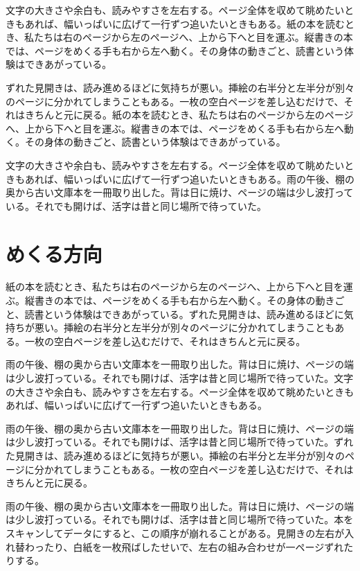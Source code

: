 \documentclass[a5paper,11pt]{ltjtbook}
\begin{document}
文字の大きさや余白も、読みやすさを左右する。ページ全体を収めて眺めたいときもあれば、幅いっぱいに広げて一行ずつ追いたいときもある。紙の本を読むとき、私たちは右のページから左のページへ、上から下へと目を運ぶ。縦書きの本では、ページをめくる手も右から左へ動く。その身体の動きごと、読書という体験はできあがっている。

ずれた見開きは、読み進めるほどに気持ちが悪い。挿絵の右半分と左半分が別々のページに分かれてしまうこともある。一枚の空白ページを差し込むだけで、それはきちんと元に戻る。紙の本を読むとき、私たちは右のページから左のページへ、上から下へと目を運ぶ。縦書きの本では、ページをめくる手も右から左へ動く。その身体の動きごと、読書という体験はできあがっている。

文字の大きさや余白も、読みやすさを左右する。ページ全体を収めて眺めたいときもあれば、幅いっぱいに広げて一行ずつ追いたいときもある。雨の午後、棚の奥から古い文庫本を一冊取り出した。背は日に焼け、ページの端は少し波打っている。それでも開けば、活字は昔と同じ場所で待っていた。

\chapter{めくる方向}
紙の本を読むとき、私たちは右のページから左のページへ、上から下へと目を運ぶ。縦書きの本では、ページをめくる手も右から左へ動く。その身体の動きごと、読書という体験はできあがっている。ずれた見開きは、読み進めるほどに気持ちが悪い。挿絵の右半分と左半分が別々のページに分かれてしまうこともある。一枚の空白ページを差し込むだけで、それはきちんと元に戻る。

雨の午後、棚の奥から古い文庫本を一冊取り出した。背は日に焼け、ページの端は少し波打っている。それでも開けば、活字は昔と同じ場所で待っていた。文字の大きさや余白も、読みやすさを左右する。ページ全体を収めて眺めたいときもあれば、幅いっぱいに広げて一行ずつ追いたいときもある。

雨の午後、棚の奥から古い文庫本を一冊取り出した。背は日に焼け、ページの端は少し波打っている。それでも開けば、活字は昔と同じ場所で待っていた。ずれた見開きは、読み進めるほどに気持ちが悪い。挿絵の右半分と左半分が別々のページに分かれてしまうこともある。一枚の空白ページを差し込むだけで、それはきちんと元に戻る。

雨の午後、棚の奥から古い文庫本を一冊取り出した。背は日に焼け、ページの端は少し波打っている。それでも開けば、活字は昔と同じ場所で待っていた。本をスキャンしてデータにすると、この順序が崩れることがある。見開きの左右が入れ替わったり、白紙を一枚飛ばしたせいで、左右の組み合わせが一ページずれたりする。
\end{document}
